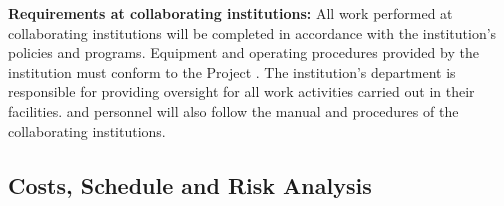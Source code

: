 {\bf Requirements at collaborating %
institutions:} All work performed at collaborating institutions will be completed in accordance with the %
institution's  policies and programs. 
Equipment and operating procedures provided by the %
institution must conform to the  Project . %
The %
institution's  department is responsible for providing   oversight for all work activities carried out in their facilities. %
 and  personnel will also follow the  manual and procedures of the collaborating institutions.


\subsection{Costs, Schedule and Risk Analysis}
\label{sec:fdsp-tc-inst-cost}



